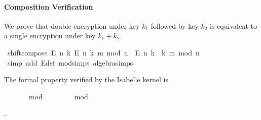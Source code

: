 \begin{isabellebody}
\begin{isamarkuptext}
\paragraph{Composition Verification}
  We prove that double encryption under key $k_1$ followed by key $k_2$ is equivalent to 
  a single encryption under key $k_1 + k_2$.%
\end{isamarkuptext}\isamarkuptrue%
\isamarkupfalse%
\ shift{\isacharunderscore}{\kern0pt}compose{\isacharcolon}{\kern0pt}\ {\isachardoublequoteopen}E\ n\ k{}\ {\isacharparenleft}{\kern0pt}E\ n\ k{}\ m{\isacharparenright}{\kern0pt}\ mod\ n\ {\isacharequal}{\kern0pt}\ E\ n\ {\isacharparenleft}{\kern0pt}k{}\ {\isacharplus}{\kern0pt}\ k{}{\isacharparenright}{\kern0pt}\ m\ mod\ n{\isachardoublequoteclose}\isanewline
%
\isadelimproof
\ \ %
\endisadelimproof
%
\isatagproof
{}\isamarkupfalse%
\ {\isacharparenleft}{\kern0pt}simp\ add{\isacharcolon}{\kern0pt}\ E{\isacharunderscore}{\kern0pt}def\ mod{\isacharunderscore}{\kern0pt}simps\ algebra{\isacharunderscore}{\kern0pt}simps{\isacharparenright}{\kern0pt}%
\endisatagproof
{\isafoldproof}%
%
\isadelimproof
%
\endisadelimproof
%
\begin{isamarkuptext}%
The formal property verified by the Isabelle kernel is %
\begin{isabelle}%
\ \ \ {\isacharparenleft}{\kern0pt}\ \ \ \ mod\ \ {\isacharequal}{\kern0pt}\ \ \ {\isacharparenleft}{\kern0pt}\ {\isacharplus}{\kern0pt}\ \ \ mod\ %
\end{isabelle}.%
\end{isamarkuptext}\isamarkuptrue%
%
\isadelimtheory
%
\endisadelimtheory
%
\isatagtheory
{}\isamarkupfalse%
%
\endisatagtheory
{\isafoldtheory}%
%
\isadelimtheory
%
\endisadelimtheory
%
\end{isabellebody}%
\endinput
